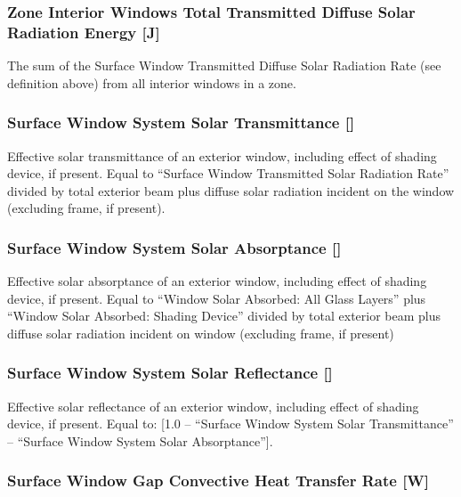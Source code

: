 \subsubsection{Zone Interior Windows Total Transmitted Diffuse Solar Radiation Energy {[}J{]}}\label{zone-interior-windows-total-transmitted-diffuse-solar-radiation-energy-j}

The sum of the Surface Window Transmitted Diffuse Solar Radiation Rate (see definition above) from all interior windows in a zone.

\subsubsection{Surface Window System Solar Transmittance {[]}}\label{surface-window-system-solar-transmittance}

Effective solar transmittance of an exterior window, including effect of shading device, if present. Equal to ``Surface Window Transmitted Solar Radiation Rate'' divided by total exterior beam plus diffuse solar radiation incident on the window (excluding frame, if present).

\subsubsection{Surface Window System Solar Absorptance {[]}}\label{surface-window-system-solar-absorptance}

Effective solar absorptance of an exterior window, including effect of shading device, if present. Equal to ``Window Solar Absorbed: All Glass Layers'' plus ``Window Solar Absorbed: Shading Device'' divided by total exterior beam plus diffuse solar radiation incident on window (excluding frame, if present)

\subsubsection{Surface Window System Solar Reflectance {[]}}\label{surface-window-system-solar-reflectance}

Effective solar reflectance of an exterior window, including effect of shading device, if present. Equal to: {[}1.0 -- ``Surface Window System Solar Transmittance'' -- ``Surface Window System Solar Absorptance''{]}.

\subsubsection{Surface Window Gap Convective Heat Transfer Rate {[}W{]}}\label{surface-window-gap-convective-heat-transfer-rate-w}

